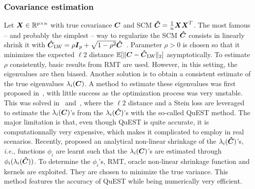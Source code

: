 \documentclass{article}
\theoremstyle{plain}
\theoremstyle{definition}
\theoremstyle{remark}
\begin{document}
\subsubsection{Covariance estimation}

Let $\boldsymbol{X}\in\mathbb{R}^{p\times n}$ with true covariance $\boldsymbol{C}$ and SCM $\boldsymbol{\hat{C}}=\frac1{n}\boldsymbol{X}\boldsymbol{X}^T$.
The most famous -- and probably the simplest -- way to regularize the SCM $\boldsymbol{\hat{C}}$ consists in linearly shrink it with $\boldsymbol{\hat{C}}_{\textup{LW}} = \rho\boldsymbol{I}_{p} + \sqrt{1-\rho^2}\boldsymbol{\hat{C}}$~\cite{ledoit2004well}.
Parameter $\rho>0$ is chosen so that it minimizes the expected $\ell2$ distance $\mathbb{E}[\| \boldsymbol{C} - \boldsymbol{\hat{C}}_{\textup{LW}} \|_2]$ asymptotically.
To estimate $\rho$ consistently, basic results from RMT are used.
%
However, in this setting, the eigenvalues are then biased. Another solution is to obtain a consistent estimate of the true eigenvalues $\lambda_i(\boldsymbol{C})$.
A method to estimate these eigenvalues was first proposed in~\cite{KAR08}, with little success as the optimization process was very unstable.
This was solved in~\cite{ledoit2015spectrum} and~\cite{ledoit2018optimal}, where the $\ell2$ distance and a Stein loss are leveraged to estimate the $\lambda_i(\boldsymbol{C})$'s from the $\lambda_i(\boldsymbol{\hat{C}})$'s with the so-called QuEST method.
The major limitation is that, even though QuEST is quite accurate, it is computationnally very expensive, which makes it complicated to employ in real scenarios.
%
Recently, \cite{ledoit2020analytical} proposed an analytical non-linear shrinkage of the $\lambda_i(\boldsymbol{\hat{C}})$'s, \emph{i.e.}, functions $\phi_i$ are learnt such that the $\lambda_i(\boldsymbol{C})$'s are estimated through $\phi_i(\lambda_i(\boldsymbol{\hat{C}}))$.
To determine the $\phi_i$'s, RMT, oracle non-linear shrinkage function and kernels are exploited.
They are chosen to minimize the true variance.
This method features the accuracy of QuEST while being numerically very efficient.
\end{document}
